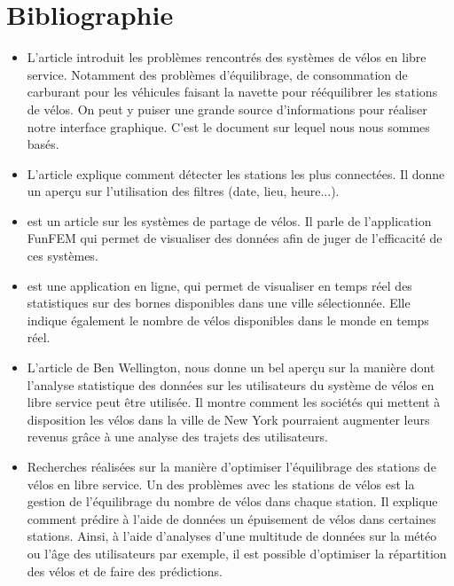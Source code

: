 \documentclass[12pt]{article}
\begin{document}
\newpage
	\section{Bibliographie}
		\begin{itemize}
			\item L'article \cite{Oli16} introduit les problèmes rencontrés
			des systèmes de vélos en libre service. Notamment des problèmes d'équilibrage,
			de consommation de carburant pour les véhicules faisant la navette pour
			rééquilibrer les stations de vélos. On peut y puiser une grande source
			d'informations pour réaliser notre interface graphique. C'est le document sur
			lequel nous nous sommes basés.\\

			\item L'article \cite{Ali14} explique comment détecter les stations les plus
			connectées. Il donne un aperçu sur l'utilisation des filtres (date, lieu, heure...).\\

			\item \cite{BC16} est un article sur les systèmes de partage de vélos. Il parle
			de l'application FunFEM qui permet de visualiser des données afin de juger de
			l'efficacité de ces systèmes.\\

			\item \cite{BSM17} est une application en ligne, qui permet de visualiser en
			temps réel des statistiques sur des bornes disponibles dans une ville
			sélectionnée.  Elle indique également le nombre de vélos disponibles dans le
			monde en temps réel.\\

			\item L'article \cite{BW} de Ben Wellington, nous donne un bel aperçu sur la
			manière dont l'analyse statistique des données sur les utilisateurs du système de
			vélos en libre service peut être utilisée. Il montre comment les sociétés qui
			mettent à disposition les vélos dans la ville de New York pourraient augmenter
			leurs revenus grâce à une analyse des trajets des utilisateurs.\\

			\item \cite{JL} Recherches réalisées sur la manière d'optimiser l'équilibrage
			des stations de vélos en libre service. Un des problèmes avec les stations de vélos
			est la gestion de l'équilibrage du nombre de vélos dans chaque station. Il explique
			comment prédire à l'aide de données un épuisement de vélos dans certaines stations.
			Ainsi, à l'aide d'analyses d'une multitude de données sur la météo ou l'âge des
			utilisateurs par exemple, il est possible d'optimiser la répartition des vélos et
			de faire des prédictions.\\


\end{itemize}
\end{document}
